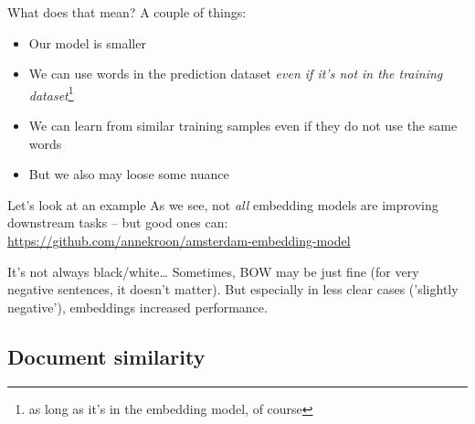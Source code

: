 \begin{frame}{What does that mean?}
	A couple of things:
	\begin{itemize}[<+->]
		\item Our model is smaller
		\item We can use words in the prediction dataset \emph{even if it's not in the training dataset}\footnote{as long as it's in the embedding model, of course}
		\item We can learn from similar training samples even if they do not use the same words
		\item But we also may loose some nuance
	\end{itemize}
\end{frame}




\begin{frame}{Let's look at an example}
	As we see, not \emph{all} embedding models are improving downstream tasks -- but good ones can:
	\url{https://github.com/annekroon/amsterdam-embedding-model}
	
\end{frame}











\begin{frame}[plain]
	

  \cite{Rudkowsky2018a}
\end{frame}


\begin{frame}{It's not always black/white\ldots}
	Sometimes, BOW may be just fine (for very negative sentences, it doesn't matter). But especially in less clear cases ('slightly negative'), embeddings increased performance.
	
	\vfill
	\cite{Rudkowsky2018a}
\end{frame}


\subsection{Document similarity}


